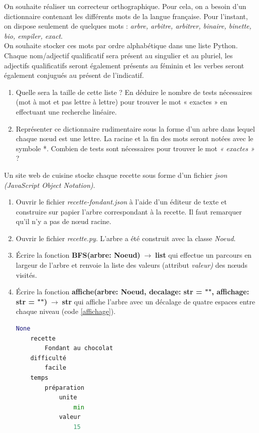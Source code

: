 \documentclass[a4paper,11pt]{article}
\begin{document}
\begin{Form}
\begin{exo}
\end{exo}
\begin{exo}
On souhaite réaliser un correcteur orthographique. Pour cela, on a besoin d’un dictionnaire contenant les différents mots
de la langue française. Pour l’instant, on dispose seulement de quelques mots : \emph{arbre, arbitre, arbitrer, binaire, binette, bio, empiler, exact}.\\
On souhaite stocker ces mots par ordre alphabétique dans une liste Python. Chaque nom/adjectif qualificatif sera
présent au singulier et au pluriel, les adjectifs qualificatifs seront également présents au féminin et les verbes seront également conjugués au présent de l’indicatif.
\begin{enumerate}
\item  Quelle sera la taille de cette liste ? En déduire le nombre de tests nécessaires (mot à mot et pas lettre à lettre) pour trouver le mot « exactes » en effectuant une recherche linéaire.
\item Représenter ce dictionnaire rudimentaire sous la forme d’un arbre dans lequel chaque nœud est une lettre. La racine et la fin des mots seront notées avec le symbole *. Combien de tests sont nécessaires pour trouver le mot \emph{« exactes »} ?
\end{enumerate}
\end{exo}
\begin{exo}
Un site web de cuisine stocke chaque recette sous forme d'un fichier \emph{json (JavaScript Object Notation)}.
\begin{enumerate}
\item Ouvrir le fichier \emph{recette-fondant.json} à l'aide d'un éditeur de texte et construire sur papier l'arbre correspondant à la recette. Il faut remarquer qu'il n'y a pas de nœud racine.
\item Ouvrir le fichier \emph{recette.py}. L'arbre a été construit avec la classe \emph{Noeud}.
\item Écrire la fonction \textbf{BFS(arbre: Noeud)$\;\rightarrow\;$list} qui effectue un parcours en largeur de l'arbre et renvoie la liste des valeurs (attribut \emph{valeur)} des nœuds visités.
\item Écrire la fonction \textbf{affiche(arbre: Noeud, decalage: str = "", affichage: str = "")$\;\rightarrow\;$str} qui affiche l'arbre avec un décalage de quatre espaces entre chaque niveau (code \ref{affichage}).
\begin{center}
\begin{lstlisting}[language=Python]
None
    recette
        Fondant au chocolat
    difficulté
        facile
    temps
        préparation
            unite
                min
            valeur
                15
\end{lstlisting}
\label{affichage}
\end{center}
\end{enumerate}
\end{exo}


\end{Form}
\end{document}
